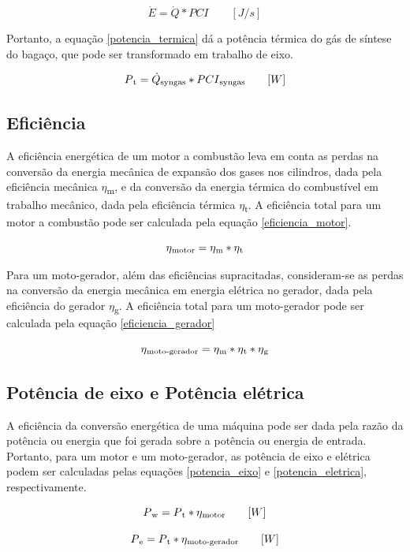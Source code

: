\begin{equation} \label{consumo_energetico}
\dot{E} = \dot{Q} * PCI   \quad\quad  [J/s]
\end{equation}

Portanto, a equação \ref{potencia_termica} dá a potência térmica do gás de síntese do bagaço, que pode ser transformado em trabalho de eixo.

\begin{equation} \label{potencia_termica}
P\textsubscript{t} = \dot{Q}\textsubscript{syngas} * PCI\textsubscript{syngas} \quad\quad  [W]
\end{equation}

\subsection{Eficiência}

A eficiência energética de um motor a combustão leva em conta as perdas na conversão da energia mecânica de expansão dos gases nos cilindros, dada pela eficiência mecânica $\eta$\textsubscript{m}, e da conversão da energia térmica do combustível em trabalho mecânico, dada pela eficiência térmica $\eta$\textsubscript{t}. A eficiência total para um motor a combustão pode ser calculada pela equação \ref{eficiencia_motor}.

\begin{equation} \label{eficiencia_motor}
\eta\textsubscript{motor} = \eta\textsubscript{m} * \eta\textsubscript{t}
\end{equation}

Para um moto-gerador, além das eficiências supracitadas, consideram-se as perdas na conversão da energia mecânica em energia elétrica no gerador, dada pela eficiência do gerador $\eta$\textsubscript{g}. A eficiência total para um moto-gerador pode ser calculada pela equação \ref{eficiencia_gerador}

\begin{equation} \label{eficiencia_gerador}
\eta\textsubscript{moto-gerador} = \eta\textsubscript{m} * \eta\textsubscript{t} * \eta\textsubscript{g}
\end{equation}


\subsection{Potência de eixo e Potência elétrica}

A eficiência da conversão energética de uma máquina pode ser dada pela razão da potência ou energia que foi gerada sobre a potência ou energia de entrada. Portanto, para um motor e um moto-gerador, as potência de eixo e elétrica podem ser calculadas pelas equações \ref{potencia_eixo} e \ref{potencia_eletrica}, respectivamente.

\begin{equation} \label{potencia_eixo}
P\textsubscript{w} = P\textsubscript{t} * \eta\textsubscript{motor} \qquad [W]
\end{equation}

\begin{equation} \label{potencia_eletrica}
P\textsubscript{e} = P\textsubscript{t} * \eta\textsubscript{moto-gerador} \qquad [W]
\end{equation}


